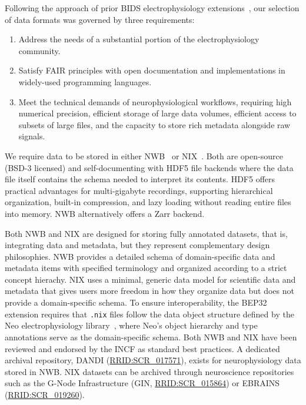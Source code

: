 \documentclass[fleqn,10pt]{article}
\newcommand{\rrid}[1]{\href{https://scicrunch.org/resolver/#1}{#1}}
\begin{document}
Following the approach of prior BIDS electrophysiology extensions~\citep{pernet_eeg-bids_2019, holdgraf_ieeg-bids_2019}, our selection of data formats was governed by three requirements:

\begin{enumerate}[noitemsep]
	\item Address the needs of a substantial portion of the electrophysiology community.
	\item Satisfy FAIR principles with open documentation and implementations in widely-used programming languages.
	\item Meet the technical demands of neurophysiological workflows, requiring high numerical precision, efficient storage of large data volumes, efficient access to subsets of large files, and the capacity to store rich metadata alongside raw signals.
\end{enumerate}

We require data to be stored in either NWB~\citep{rubel_neurodata_2022} or NIX~\citep{adrian_file_2014}.
Both are open-source (BSD-3 licensed) and self-documenting with HDF5 file backends where the data file itself contains the schema needed to interpret its contents.
HDF5 offers practical advantages for multi-gigabyte recordings, supporting hierarchical organization, built-in compression, and lazy loading without reading entire files into memory.
NWB alternatively offers a Zarr backend.

Both NWB and NIX are designed for storing fully annotated datasets, that is, integrating data and metadata, but they represent complementary design philosophies.
NWB provides a detailed schema of domain-specific data and metadata items with specified terminology and organized according to a strict concept hierachy.
NIX uses a minimal, generic data model for scientific data and metadata that gives users more freedom in how they organize data but does not provide a domain-specific schema.
To ensure interoperability, the BEP32 extension requires that \texttt{.nix} files follow the data object structure defined by the Neo electrophysiology library~\citep{garcia_neo_2014}, where Neo's object hierarchy and type annotations serve as the domain-specific schema.
Both NWB and NIX have been reviewed and endorsed by the INCF as standard best practices. A dedicated archival repository, DANDI (\rrid{RRID:SCR\_017571}), exists for neurophysiology data stored in NWB. NIX datasets can be archived through neuroscience repositories such as the G-Node Infrastructure (GIN, \rrid{RRID:SCR\_015864}) or EBRAINS (\rrid{RRID:SCR\_019260}).
\end{document}
